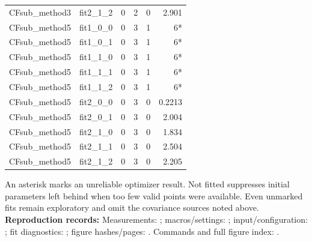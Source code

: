 \documentclass[11pt,a4paper]{article}
\begin{document}
{\begin{longtable}{llrrrr}
CFsub\_method3 & fit2\_1\_2 & 0 & 2 & 0 & 2.901\\
CFsub\_method5 & fit1\_0\_0 & 0 & 3 & 1 & 6*\\
CFsub\_method5 & fit1\_0\_1 & 0 & 3 & 1 & 6*\\
CFsub\_method5 & fit1\_1\_0 & 0 & 3 & 1 & 6*\\
CFsub\_method5 & fit1\_1\_1 & 0 & 3 & 1 & 6*\\
CFsub\_method5 & fit1\_1\_2 & 0 & 3 & 1 & 6*\\
CFsub\_method5 & fit2\_0\_0 & 0 & 3 & 0 & 0.2213\\
CFsub\_method5 & fit2\_0\_1 & 0 & 3 & 0 & 2.004\\
CFsub\_method5 & fit2\_1\_0 & 0 & 3 & 0 & 1.834\\
CFsub\_method5 & fit2\_1\_1 & 0 & 3 & 0 & 2.504\\
CFsub\_method5 & fit2\_1\_2 & 0 & 3 & 0 & 2.205\\
\hline\end{longtable}}
An asterisk marks an unreliable optimizer result. Not fitted suppresses initial parameters left behind when too few valid points were available. Even unmarked fits remain exploratory and omit the covariance sources noted above.
{\small\textbf{Reproduction records:} Measurements: ; macros/settings: ; input/configuration: ; fit diagnostics: ; figure hashes/pages: . Commands and full figure index: .}
\end{document}
